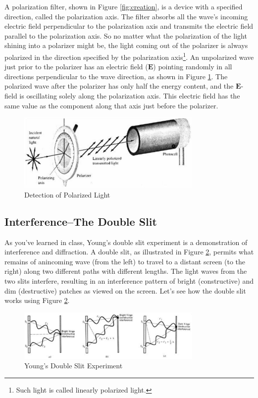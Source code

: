 A polarization filter, shown in Figure {\ref{fig:creation}}, is a device with a specified direction, called the polarization axis. The filter absorbs all the wave's incoming electric field perpendicular to the polarization axis and transmits the electric field parallel to the polarization axis. So no matter what the polarization of the light shining into a polarizer might be, the light coming out of the polarizer is always polarized in the direction specified by the polarization axis\footnote{Such light is called linearly polarized light.}. An unpolarized wave just prior to the polarizer has an electric field ($\mathbf{E}$) pointing randomly in all directions perpendicular to the wave direction, as shown in Figure {\ref{fig:detection}}. The polarized wave after the polarizer has only half the energy content, and the $\mathbf{E}$-field is oscillating solely along the polarization axis. This electric field has the same value as the component along that axis just before the polarizer.
\begin{figure}[h]
\centering
\includegraphics[width=0.8\textwidth]{./Exp7/pic/image2.png}
\caption{Detection of Polarized Light}
\label{fig:detection}
\end{figure}

\subsection{Interference--The Double Slit}
As you've learned in class, Young's double slit experiment is a demonstration of interference and diffraction. A double slit, as illustrated in Figure {\ref{fig:double}}, permits what remains of anincoming wave (from the left) to travel to a distant screen (to the right) along two different paths with different lengths. The light waves from the two slits interfere, resulting in an interference pattern of bright (constructive) and dim (destructive) patches as viewed on the screen. Let's see how the double slit works using Figure {\ref{fig:double}}.
\begin{figure}[h]
\centering
\includegraphics[width=0.8\textwidth]{./Exp7/pic/image3.png}
\caption{Young's Double Slit Experiment}
\label{fig:double}
\end{figure}

